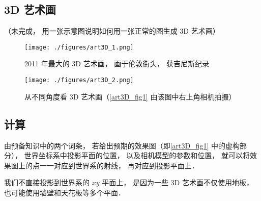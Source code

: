 
\subsection{3D 艺术画}
（未完成， 用一张示意图说明如何用一张正常的图生成 3D 艺术画）
\begin{figure}[ht]
\centering
\texttt{[image: ./figures/art3D\_1.png]}
\caption{2011 年最大的 3D 艺术画， 画于伦敦街头， 获吉尼斯纪录} \label{art3D_fig1}
\end{figure}

\begin{figure}[ht]
\centering
\texttt{[image: ./figures/art3D\_2.png]}
\caption{从不同角度看 3D 艺术画（\autoref{art3D_fig1} 由该图中右上角相机拍摄）} \label{art3D_fig2}
\end{figure}


\subsection{计算}


由预备知识中的两个词条， 若给出预期的效果图（即\autoref{art3D_fig1} 中的虚构部分）， 世界坐标系中投影平面的位置， 以及相机模型的参数和位置， 就可以将效果图上的点一一对应到世界系的射线， 再对应到投影平面上．

我们不直接投影到世界系的 $xy$ 平面上， 是因为一些 3D 艺术画不仅使用地板， 也可能使用墙壁和天花板等多个平面．


